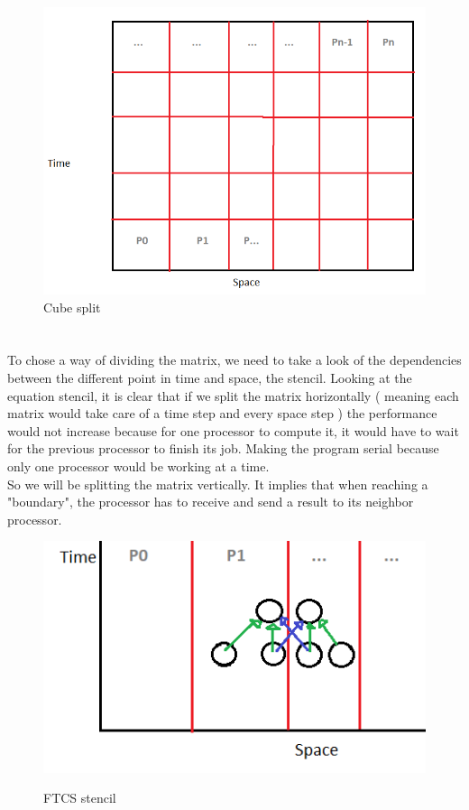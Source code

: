 \documentclass[12pt, a4paper]{report}
\begin{document}
\begin{figure}
\includegraphics[scale=0.4]{report/cube.png} 
\caption{Cube split}
\end{figure}
\section*{}
To chose a way of dividing the matrix, we need to take a look of the dependencies between the different point in time and space, the stencil.
Looking at the equation stencil, it is clear that if we split the matrix horizontally ( meaning each matrix would take care of a time step and every space step ) the performance would not increase because for one processor to compute it, it would have to wait for the previous processor to finish its job. Making the program serial because only one processor would be working at a time.\\
So we will be splitting the matrix vertically. It implies that when reaching a "boundary", the processor has to receive and send a result to its neighbor processor.\\
\begin{figure}[H]
\includegraphics[scale=0.5]{report/stencilVertical.png}\\
\caption{FTCS stencil}
\end{figure}
\end{document}
